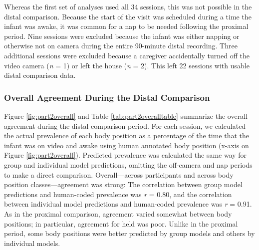 \documentclass[
  man]{apa6}
\begin{document}
Whereas the first set of analyses used all 34 sessions, this was not possible in the distal comparison. Because the start of the visit was scheduled during a time the infant was awake, it was common for a nap to be needed following the proximal period. Nine sessions were excluded because the infant was either napping or otherwise not on camera during the entire 90-minute distal recording. Three additional sessions were excluded because a caregiver accidentally turned off the video camera (\emph{n} = 1) or left the house (\emph{n} = 2). This left 22 sessions with usable distal comparison data.

\hypertarget{overall-agreement-during-the-distal-comparison}{%
\subsubsection{Overall Agreement During the Distal Comparison}\label{overall-agreement-during-the-distal-comparison}}

Figure \ref{fig:part2overall} and Table \ref{tab:part2overalltable} summarize the overall agreement during the distal comparison period. For each session, we calculated the actual prevalence of each body position as a percentage of the time that the infant was on video and awake using human annotated body position (x-axis on Figure \ref{fig:part2overall}). Predicted prevalence was calculated the same way for group and individual model predictions, omitting the off-camera and nap periods to make a direct comparison. Overall---across participants and across body position classes---agreement was strong: The correlation between group model predictions and human-coded prevalence was \emph{r} = 0.80, and the correlation between individual model predictions and human-coded prevalence was \emph{r} = 0.91. As in the proximal comparison, agreement varied somewhat between body positions; in particular, agreement for held was poor. Unlike in the proximal period, some body positions were better predicted by group models and others by individual models.
\end{document}
